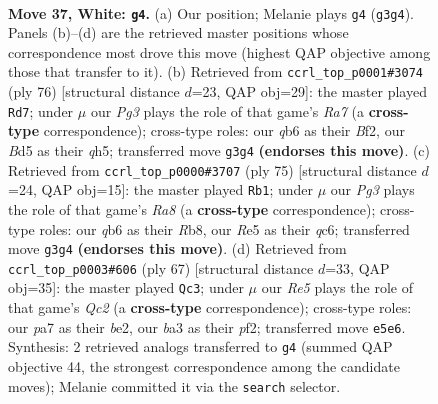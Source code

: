 \documentclass[11pt]{article}
\begin{document}
\clearpage

\begin{figure}[p]\centering
\begin{subfigure}{0.46\textwidth}\centering
\resizebox{\linewidth}{!}{%
\newchessgame
\chessboard[
  setfen={8/pp4kp/1q4p1/3BR3/7P/b5P1/5PK1/8 w - - 1 37},
  showmover=false,
  pgfstyle=straightmove, color=movearrow, markmove={g3-g4}
]}
\caption{}
\end{subfigure}\hfill
\begin{subfigure}{0.46\textwidth}\centering
\resizebox{\linewidth}{!}{%
\newchessgame
\chessboard[
  setfen={8/R4ppk/1p1p3p/4p2q/4P3/2R2P2/5B2/6K1 w - - 2 39},
  showmover=false,
  pgfstyle=straightmove, color=movearrow, markmove={a7-d7}
]}
\caption{}
\end{subfigure}
\\[4pt]
\begin{subfigure}{0.46\textwidth}\centering
\resizebox{\linewidth}{!}{%
\newchessgame
\chessboard[
  setfen={1r3bk1/1P3p2/2Q1P1pp/8/5P2/7P/6PK/r7 b - - 1 38},
  showmover=false,
  pgfstyle=straightmove, color=movearrow, markmove={a1-b1}
]}
\caption{}
\end{subfigure}\hfill
\begin{subfigure}{0.46\textwidth}\centering
\resizebox{\linewidth}{!}{%
\newchessgame
\chessboard[
  setfen={8/2q1kp2/4p2p/4b3/7P/1P3QP1/4BP2/6K1 b - - 4 34},
  showmover=false,
  pgfstyle=straightmove, color=movearrow, markmove={c7-c3}
]}
\caption{}
\end{subfigure}
\caption{\textbf{Move 37, White: \texttt{g4}.} (a) Our position; Melanie plays \texttt{g4} (\texttt{g3g4}). Panels (b)--(d) are the retrieved master positions whose correspondence most drove this move (highest QAP objective among those that transfer to it). (b) Retrieved from \texttt{ccrl\_top\_p0001\#3074} (ply 76) [structural distance $d$=23, QAP obj=29]: the master played \texttt{Rd7}; under $\mu$ our \emph{Pg3} plays the role of that game's \emph{Ra7} (a \textbf{cross-type} correspondence); cross-type roles: our \emph{q}b6 as their \emph{B}f2, our \emph{B}d5 as their \emph{q}h5; transferred move \texttt{g3g4} \textbf{(endorses this move)}. (c) Retrieved from \texttt{ccrl\_top\_p0000\#3707} (ply 75) [structural distance $d$=24, QAP obj=15]: the master played \texttt{Rb1}; under $\mu$ our \emph{Pg3} plays the role of that game's \emph{Ra8} (a \textbf{cross-type} correspondence); cross-type roles: our \emph{q}b6 as their \emph{R}b8, our \emph{R}e5 as their \emph{q}c6; transferred move \texttt{g3g4} \textbf{(endorses this move)}. (d) Retrieved from \texttt{ccrl\_top\_p0003\#606} (ply 67) [structural distance $d$=33, QAP obj=35]: the master played \texttt{Qc3}; under $\mu$ our \emph{Re5} plays the role of that game's \emph{Qc2} (a \textbf{cross-type} correspondence); cross-type roles: our \emph{p}a7 as their \emph{b}e2, our \emph{b}a3 as their \emph{p}f2; transferred move \texttt{e5e6}. Synthesis: 2 retrieved analogs transferred to \texttt{g4} (summed QAP objective 44, the strongest correspondence among the candidate moves); Melanie committed it via the \texttt{search} selector.}
\label{fig:thought-m72}
\end{figure}
\end{document}
